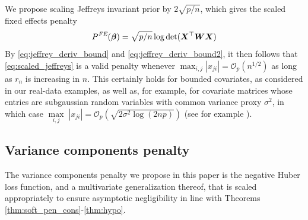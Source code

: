 \documentclass[11pt, a4paper]{article}
\newcommand*{\bb}{\boldsymbol}
\newcommand{\Op}[1]{\ensuremath{{\mathcal{O}_p(#1)}}}
\theoremstyle{example} \newtheorem{example}{Example}[section]
\theoremstyle{theorem} \newtheorem{theorem}{Theorem}[section]
\def\det{{\mathop{\rm det}}}
\def\bbeta{\bb{\beta}}
\def\bX{\bb{X}}
\def\bW {\bb{W}}
\begin{document}
 We propose scaling Jeffreys invariant prior by $ 2 \sqrt{p/n} $, which gives the scaled fixed effects penalty 
\begin{equation}\label{eq:scaled_jeffreys}
	P^{\textit{FE}}(\bbeta) = \sqrt{p/n} \log \det(\bX^\top \bW \bX)
\end{equation}
By \eqref{eq:jeffrey_deriv_bound} and \eqref{eq:jeffrey_deriv_bound2}, it then follows that \eqref{eq:scaled_jeffreys} is a valid penalty whenever $\max_{i,j} |x_{ji} | = \Op{n^{1/2}}$ as long as $r_n$ is increasing in $n$. This certainly holds for bounded covariates, as considered in our real-data examples, as well as, for example, for covariate matrices whose entries are subgaussian random variables with common variance proxy $\sigma^2$, in which case $ \underset{i,j}{\max}\;  |x_{ji} | = \Op{\sqrt{2\sigma^2 \log(2np)}}$ (see for example \citet[Theorem 1.14]{rigollet2015high}). 

\subsection{Variance components penalty}
\label{sec:glmm_re_pen}
The variance components penalty we propose in this paper is the negative Huber loss function, and a multivariate generalization thereof, that is scaled appropriately to ensure asymptotic negligibility in line with Theorems \ref{thm:soft_pen_cons}-\ref{thm:hypo}. 
\end{document}
